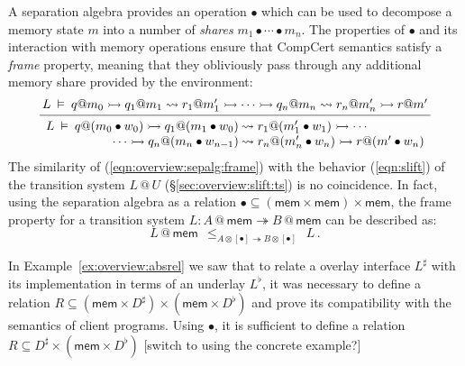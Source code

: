 \documentclass[acmsmall,screen,review,anonymous]{acmart}
\newcommand{\kw}[1]{\ensuremath{ \mathsf{#1} }}
\begin{document}

A separation algebra \citep{sepalg} provides an operation $\bullet$
which can be used to decompose a memory state $m$ into
a number of \emph{shares}
$
  m_1 \bullet \cdots \bullet m_n
$.
The properties of $\bullet$
and its interaction with memory operations
ensure that CompCert semantics satisfy
a \emph{frame} property,
meaning that they
obliviously pass through
any additional memory share
provided by the environment:
\begin{equation} \label{eqn:overview:sepalg:frame}
  \begin{prooftree}
  \hypo{
  L \:\vDash\: q@m_0 \rightarrowtail
    q_1@m_1 \leadsto r_1@m_1' \rightarrowtail
    \cdots \rightarrowtail
    q_n@m_n \leadsto r_n@m_n' \rightarrowtail
    r@m'}
  \infer1{
   {\begin{array}{r@{\:}l}
    L \:\vDash\: q@(m_0 \bullet w_0) \rightarrowtail
      q_1@(m_1 \bullet w_0) &\leadsto r_1@(m_1' \bullet w_1) \rightarrowtail
      \cdots \\ \cdots \rightarrowtail
      q_n@(m_n \bullet w_{n-1}) &\leadsto r_n@(m_n' \bullet w_n) \rightarrowtail
      r@(m' \bullet w_n)
   \end{array}} }
  \end{prooftree}
\end{equation}
The similarity of (\ref{eqn:overview:sepalg:frame})
with the behavior (\ref{eqn:slift})
of the transition system $L \mathbin@ U$ (\S\ref{sec:overview:slift:ts})
is no coincidence.
In fact,
using the separation algebra as a relation
${\bullet} \subseteq (\kw{mem} \times \kw{mem}) \times \kw{mem}$,
the frame property for a transition system
$L : A \mathbin@ \kw{mem} \twoheadrightarrow B \mathbin@ \kw{mem}$
can be described as:
\[
  L \mathbin@ \kw{mem}
  \:\:
  \le_{A \otimes [\bullet] \twoheadrightarrow B \otimes [\bullet]}
  \:\:
  L
  \,.
\]

\begin{example}
In Example~\ref{ex:overview:absrel} we saw that to relate a overlay interface
$L^\sharp$
with its implementation in terms of an underlay $L^\flat$,
it was necessary to define a relation
$R \subseteq (\kw{mem} \times D^\sharp) \times (\kw{mem} \times D^\flat)$
and prove its compatibility with the semantics of client programs.
Using $\bullet$,
it is sufficient to define a relation
$R \subseteq D^\sharp \times (\kw{mem} \times D^\flat)$
[switch to using the concrete example?]
\end{example}
\end{document}
